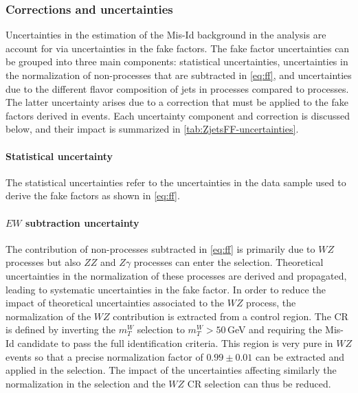 \subsubsection{Corrections and uncertainties}
Uncertainties in the estimation of the Mis-Id background in the analysis are account for via uncertainties in the fake factors.
The fake factor uncertainties can be grouped into three main components: statistical uncertainties, uncertainties in the normalization of non-\Zjets processes that are subtracted in \cref{eq:ff}, and uncertainties due to the different flavor composition of jets in \Zjets processes compared to \Wjets processes. 
The latter uncertainty arises due to a correction that must be applied to the fake factors derived in \Zjets events. 
Each uncertainty component and correction is discussed below, and their impact is summarized in \cref{tab:ZjetsFF-uncertainties}.


\paragraph{Statistical uncertainty} 
The statistical uncertainties refer to the uncertainties in the data sample used to derive the fake factors as shown in \cref{eq:ff}. 

\paragraph{$EW$ subtraction uncertainty}
The contribution of non-\Zjets processes subtracted in \cref{eq:ff} is primarily due to $WZ$ processes but also $ZZ$ and $Z\gamma$ processes can enter the \Zjets selection. 
Theoretical uncertainties in the normalization of these processes are derived and propagated, leading to systematic uncertainties in the fake factor. 
In order to reduce the impact of theoretical uncertainties associated to the $WZ$ process, the normalization of the $WZ$ contribution is extracted from a control region. The CR is defined by inverting the $m_T^W$ selection to $m_T^W > 50\,$GeV and requiring the Mis-Id candidate to pass the full identification criteria. This region is very pure in $WZ$ events so that a precise normalization factor of $0.99 \pm 0.01$ can be extracted and applied in the \Zjets selection. The impact of the uncertainties affecting similarly the normalization in the \Zjets selection and the $WZ$ CR selection can thus be reduced.



